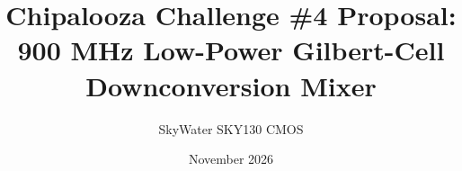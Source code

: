 \title{\textbf{Chipalooza Challenge \#4 Proposal: 900 MHz Low-Power Gilbert-Cell Downconversion Mixer}
}
\author{
    SkyWater SKY130 CMOS
}
\date{November 2026}

\maketitle
